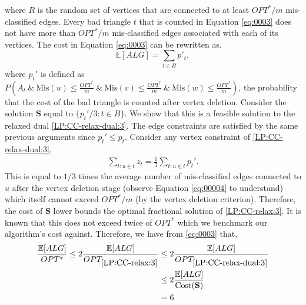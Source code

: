 where $R$ is the random set of vertices that are connected to at least $OPT^* / m$ mis-classified edges. Every bad triangle $t$ that is counted in Equation \eqref{eq:0003} does not have more than $OPT^*/m$ mis-classified edges associated with each of its vertices. The cost in Equation \eqref{eq:0003} can be rewritten as,
\begin{equation}
    \mathbb{E} [ALG] = \sum_{t \in B} p'_t,
\end{equation}
where $p_t'$ is defined as $P \left( A_t \ \& \ \mathrm{Mis} (u) \le \frac{OPT^*}{m} \ \& \ \mathrm{Mis}(v) \le \frac{OPT^*}{m} \ \&\ \mathrm{Mis} (w) \le \frac{OPT^*}{m} \right)$, the probability that the cost of the bad triangle is counted after vertex deletion.
Consider the solution $ \mathbf{S}$ equal to $\{ p_t' / 3 : t \in B \}$. We show that this is a feasible solution to the relaxed dual \ref{LP:CC-relax-dual:3}. The edge constraints are satisfied by the same previous arguments since $p_t' \le p_t$. Consider any vertex constraint of \ref{LP:CC-relax-dual:3},
\begin{align*}
    \sum_{t : u \in t} z_t = \frac{1}{3} \sum_{t : u \in t} p_t'.
\end{align*}
This is equal to $1/3$ times the average number of mis-classified edges connected to $u$ after the vertex deletion stage (observe Equation \eqref{eq:00004} to understand) which itself cannot exceed $OPT^* / m$ (by the vertex deletion criterion).
Therefore, the cost of $\mathbf{S}$ lower bounds the optimal fractional solution of \ref{LP:CC-relax:3}. It is known that this does not exceed twice of $OPT^*$ which we benchmark our algorithm's cost against. Therefore, we have from \eqref{eq:0003} that,
\begin{align*}
    \frac{\mathbb{E} [ALG]}{OPT^*} \le 2 \frac{\mathbb{E} [ALG]}{OPT_{\ref{LP:CC-relax:3}}} &\le 2 \frac{\mathbb{E} [ALG]}{OPT_{\ref{LP:CC-relax-dual:3}}} \\
    &\le 2\frac{\mathbb{E} [ALG]}{\mathrm{Cost} (\mathbf{S})} \\
    &= 6
\end{align*}